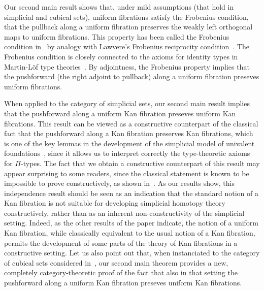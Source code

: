 \documentclass[reqno,10pt,a4paper,oneside,draft]{amsart}
\begin{document}
Our second main result shows that, under mild assumptions (that hold in simplicial and cubical sets), uniform fibrations satisfy the Frobenius condition, \ie that the pullback along a uniform fibration preserves the weakly left orthogonal maps to uniform fibrations.
This property has been called the Frobenius condition in~\cite{garner:types-omega-groupoids} by analogy with Lawvere's Frobenius reciprocity condition~\cite{lawvere-equality}.
The Frobenius condition is closely connected to the axioms for identity types in Martin-L\"of type theories~\cite[Section~4]{gambino-garner:idtypewfs}.
By adjointness, the Frobenius property implies that the pushforward (\ie the right adjoint to pullback) along a uniform fibration preseves uniform fibrations.

When applied to the category of simplicial sets, our second main result implies that the pushforward along a uniform Kan fibration preseves uniform Kan fibrations.
This result can be viewed as a constructive counterpart of the classical fact that the pushforward along a Kan fibration preserves Kan fibrations, which is one of the key lemmas in the development of the simplicial model of univalent foundations~\cite[Lemma 2.3.1]{voevodsky-simplicial-model}, since it allows us to interpret correctly the type-theoretic axioms for $\Pi$-types.
The fact that we obtain a constructive counterpart of this result may appear surprising to some readers, since the classical statement is known to be impossible to prove constructively, as shown in~\cite{coquand-non-constructivity-kan}.
As our results show, this independence result should be seen as an indication that the standard notion of a Kan fibration is not suitable for developing simplicial homotopy theory constructively, rather than as an inherent non-constructivity of the simplicial setting.
Indeed, as the other results of the paper indicate, the notion of a uniform Kan fibration, while classically equivalent to the usual notion of a Kan fibration, permits the development of some parts of the theory of Kan fibrations in a constructive setting.
Let us also point out that, when instanciated to the category of cubical sets considered in~\cite{coquand-variation}, our second main theorem provides a new, completely category-theoretic proof of the fact that also in that setting the pushforward along a uniform Kan fibration preseves uniform Kan fibrations.
\end{document}
